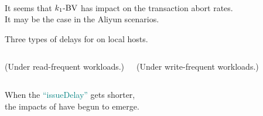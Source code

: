 \begin{frame}{}
  \begin{center}
     \\[10pt]
    It seems that $\konebv$ has \emph{} impact on the transaction abort rates. \\[30pt]
    \pause
    It may be the case in the Aliyun scenarios. \\[10pt]
  \end{center}
\end{frame}

\begin{frame}{}
  \centerline{Three types of delays for  on local hosts.}
  \begin{center}
    
  \end{center}

  
\end{frame}

\begin{frame}{}
  \begin{columns}
      \vspace{-0.40cm}
      \centerline{\footnotesize (Under read-frequent workloads.)}
      \vspace{-0.40cm}
      \centerline{\footnotesize (Under write-frequent workloads.)}
  \end{columns}

  \vspace{0.40cm}
  \begin{center}
    When the \textcolor{teal}{``issueDelay''} gets shorter, \\
    the impacts of \red{$\konebv$} have begun to emerge.
  \end{center}
\end{frame}

